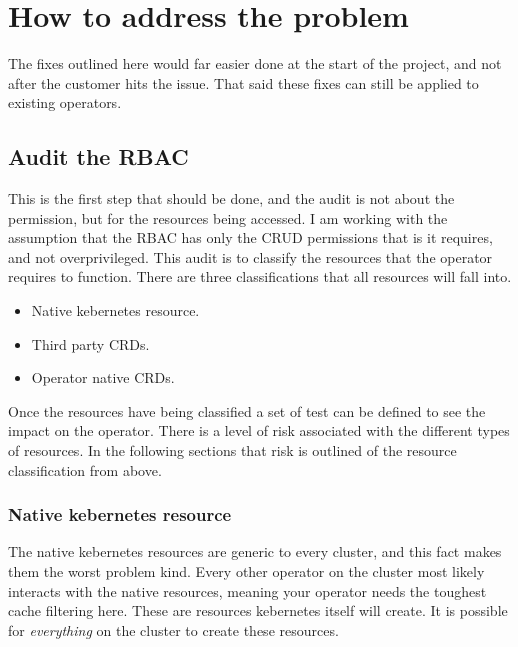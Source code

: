 \section{How to address the \nn{} problem}
\label{sec:fix}

The fixes outlined here would far easier done at the start of the project, and not after the customer hits the issue.
That said these fixes can still be applied to existing operators.

\subsection{Audit the RBAC}
\label{sec:fix:audit}
This is the first step that should be done, and the audit is not about the permission, but for the resources being accessed.
I am working with the assumption that the RBAC has only the CRUD permissions that is it requires, and not overprivileged.
This audit is to classify the resources that the operator requires to function.
There are three classifications that all resources will fall into.

\begin{itemize}
	\item Native kebernetes resource.
	\item Third party CRDs.
	\item Operator native CRDs.
\end{itemize}

Once the resources have being classified a set of test can be defined to see the impact on the operator.
There is a level of risk associated with the different types of resources.
In the following sections that risk is outlined of the resource classification from above.

\subsubsection{Native kebernetes resource}
The native kebernetes resources are generic to every cluster, and this fact makes them the worst problem kind.
Every other operator on the cluster most likely interacts with the native resources, meaning your operator needs the toughest cache filtering here.
These are resources kebernetes itself will create.
It is possible for \textit{everything} on the cluster to create these resources.

